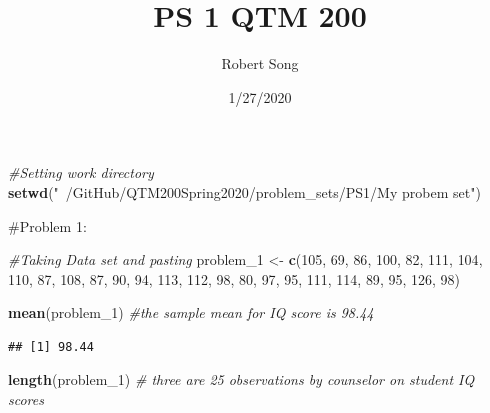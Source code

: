 \documentclass[]{article}
\title{PS 1 QTM 200}
\author{Robert Song}
\date{1/27/2020}
\newenvironment{Shaded}{\begin{snugshade}}{\end{snugshade}}
\newcommand{\CommentTok}[1]{\textcolor[rgb]{0.56,0.35,0.01}{\textit{#1}}}
\newcommand{\DecValTok}[1]{\textcolor[rgb]{0.00,0.00,0.81}{#1}}
\newcommand{\KeywordTok}[1]{\textcolor[rgb]{0.13,0.29,0.53}{\textbf{#1}}}
\newcommand{\NormalTok}[1]{#1}
\newcommand{\StringTok}[1]{\textcolor[rgb]{0.31,0.60,0.02}{#1}}
\begin{document}
\maketitle

\begin{Shaded}
\begin{Highlighting}[]
\CommentTok{#Setting work directory }
\KeywordTok{setwd}\NormalTok{(}\StringTok{"~/GitHub/QTM200Spring2020/problem_sets/PS1/My probem set"}\NormalTok{)}
\end{Highlighting}
\end{Shaded}

\#Problem 1:

\begin{Shaded}
\begin{Highlighting}[]
\CommentTok{#Taking Data set and pasting}
\NormalTok{problem_}\DecValTok{1}\NormalTok{ <-}\StringTok{ }\KeywordTok{c}\NormalTok{(}\DecValTok{105}\NormalTok{, }\DecValTok{69}\NormalTok{, }\DecValTok{86}\NormalTok{, }\DecValTok{100}\NormalTok{, }\DecValTok{82}\NormalTok{, }\DecValTok{111}\NormalTok{, }\DecValTok{104}\NormalTok{, }\DecValTok{110}\NormalTok{, }\DecValTok{87}\NormalTok{, }\DecValTok{108}\NormalTok{, }\DecValTok{87}\NormalTok{, }\DecValTok{90}\NormalTok{, }\DecValTok{94}\NormalTok{, }\DecValTok{113}\NormalTok{, }\DecValTok{112}\NormalTok{, }\DecValTok{98}\NormalTok{, }\DecValTok{80}\NormalTok{, }\DecValTok{97}\NormalTok{, }\DecValTok{95}\NormalTok{, }\DecValTok{111}\NormalTok{, }\DecValTok{114}\NormalTok{, }\DecValTok{89}\NormalTok{, }\DecValTok{95}\NormalTok{, }\DecValTok{126}\NormalTok{, }\DecValTok{98}\NormalTok{)}
\end{Highlighting}
\end{Shaded}

\begin{Shaded}
\begin{Highlighting}[]
\KeywordTok{mean}\NormalTok{(problem_}\DecValTok{1}\NormalTok{) }\CommentTok{#the sample mean for IQ score is 98.44}
\end{Highlighting}
\end{Shaded}

\begin{verbatim}
## [1] 98.44
\end{verbatim}

\begin{Shaded}
\begin{Highlighting}[]
\KeywordTok{length}\NormalTok{(problem_}\DecValTok{1}\NormalTok{) }\CommentTok{# three are 25 observations by counselor on student IQ scores}
\end{Highlighting}
\end{Shaded}
\end{document}

